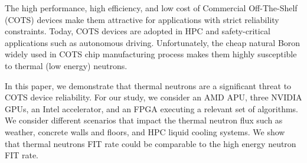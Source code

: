 The high performance, high efficiency, and low cost of Commercial Off-The-Shelf (COTS) devices make them attractive for applications with strict reliability constraints. Today, COTS devices are adopted in HPC and safety-critical applications such as autonomous driving. Unfortunately, the cheap natural Boron widely used in COTS chip manufacturing process makes them highly susceptible to thermal (low energy) neutrons.
 
In this paper, we demonstrate that thermal neutrons are a significant threat to COTS device reliability. For our study, we consider an AMD APU, three NVIDIA GPUs, an Intel accelerator, and an FPGA executing a relevant set of algorithms. We consider different scenarios that impact the thermal neutron flux such as weather, concrete walls and floors, and HPC liquid cooling systems. We show that thermal neutrons 
FIT rate could be comparable to the high energy neutron FIT rate.


